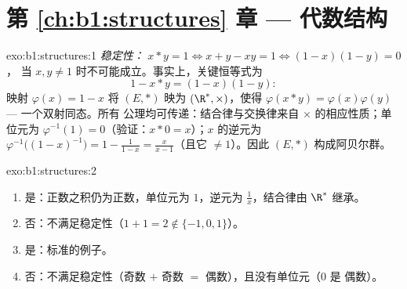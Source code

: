 \section*{第 \ref{ch:b1:structures} 章 --- 代数结构}

\begin{solution}{exo:b1:structures:1}
\emph{稳定性：} $x * y = 1 \iff x + y - xy = 1 \iff (1-x)(1-y) = 0$，
当 $x, y \neq 1$ 时不可能成立。事实上，关键恒等式为
\[
1 - x * y = (1 - x)(1 - y):
\]
映射 $\varphi(x) = 1 - x$ 将 $(E, *)$ 映为 $(\R^*, \times)$，使得
$\varphi(x * y) = \varphi(x)\varphi(y)$ --- 一个双射同态。所有
公理均可传递：结合律与交换律来自
$\times$ 的相应性质；单位元为 $\varphi^{-1}(1) = 0$（验证：$x *
0 = x$）；$x$ 的逆元为 $\varphi^{-1}\bigl((1-x)^{-1}\bigr) =
1 - \frac{1}{1-x} = \frac{x}{x - 1}$（且它 $\neq 1$）。因此 $(E, *)$
构成阿贝尔群。
\end{solution}

\begin{solution}{exo:b1:structures:2}
\begin{enumerate}
  \item 是：正数之积仍为正数，单位元为 $1$，逆元为
        $\frac 1x$，结合律由 $\R^*$ 继承。
  \item 否：不满足稳定性（$1 + 1 = 2 \notin \{-1,0,1\}$）。
  \item 是：标准的例子。
  \item 否：不满足稳定性（奇数 $+$ 奇数 $=$ 偶数），且没有单位元（$0$ 是
        偶数）。
\end{enumerate}
\end{solution}

